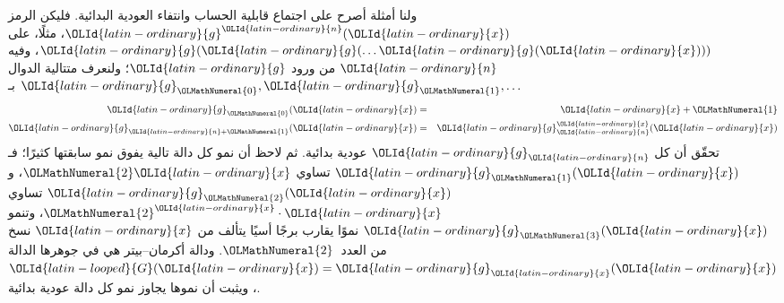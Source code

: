 \documentclass[../../../include/open-logic-section]{subfiles}
\begin{document}
ولنا أمثلة أصرح على اجتماع قابلية الحساب وانتفاء العودية البدائية. فليكن
الرمز $\OLId{latin-ordinary}{g}^\OLId{latin-ordinary}{n}(\OLId{latin-ordinary}{x})$، مثلًا، على $\OLId{latin-ordinary}{g}(\OLId{latin-ordinary}{g}(\dots \OLId{latin-ordinary}{g}(\OLId{latin-ordinary}{x})))$، وفيه $\OLId{latin-ordinary}{n}$ من ورود
$\OLId{latin-ordinary}{g}$؛ ولنعرف متتالية الدوال $\OLId{latin-ordinary}{g}_\OLMathNumeral{0},\OLId{latin-ordinary}{g}_\OLMathNumeral{1},\dots$ بـ
\begin{eqnarray*}
\OLId{latin-ordinary}{g}_\OLMathNumeral{0}(\OLId{latin-ordinary}{x}) & = & \OLId{latin-ordinary}{x}+\OLMathNumeral{1} \\
\OLId{latin-ordinary}{g}_{\OLId{latin-ordinary}{n} + \OLMathNumeral{1}}(\OLId{latin-ordinary}{x}) & = & \OLId{latin-ordinary}{g}_\OLId{latin-ordinary}{n}^\OLId{latin-ordinary}{x}(\OLId{latin-ordinary}{x})
\end{eqnarray*}
تحقّق أن كل $\OLId{latin-ordinary}{g}_\OLId{latin-ordinary}{n}$ عودية بدائية. ثم لاحظ أن نمو كل دالة تالية
يفوق نمو سابقتها كثيرًا؛ فـ$\OLId{latin-ordinary}{g}_\OLMathNumeral{1}(\OLId{latin-ordinary}{x})$ تساوي $\OLMathNumeral{2}\OLId{latin-ordinary}{x}$، و$\OLId{latin-ordinary}{g}_\OLMathNumeral{2}(\OLId{latin-ordinary}{x})$ تساوي
$\OLMathNumeral{2}^\OLId{latin-ordinary}{x}\cdot \OLId{latin-ordinary}{x}$، وتنمو $\OLId{latin-ordinary}{g}_\OLMathNumeral{3}(\OLId{latin-ordinary}{x})$ نموًا يقارب برجًا أسيًا يتألف من $\OLId{latin-ordinary}{x}$
نسخ من العدد~$\OLMathNumeral{2}$. ودالة أكرمان--بيتر هي في جوهرها الدالة $\OLId{latin-looped}{G}(\OLId{latin-ordinary}{x})=\OLId{latin-ordinary}{g}_\OLId{latin-ordinary}{x}(\OLId{latin-ordinary}{x})$،
ويثبت أن نموها يجاوز نمو كل دالة عودية بدائية.
\end{document}
